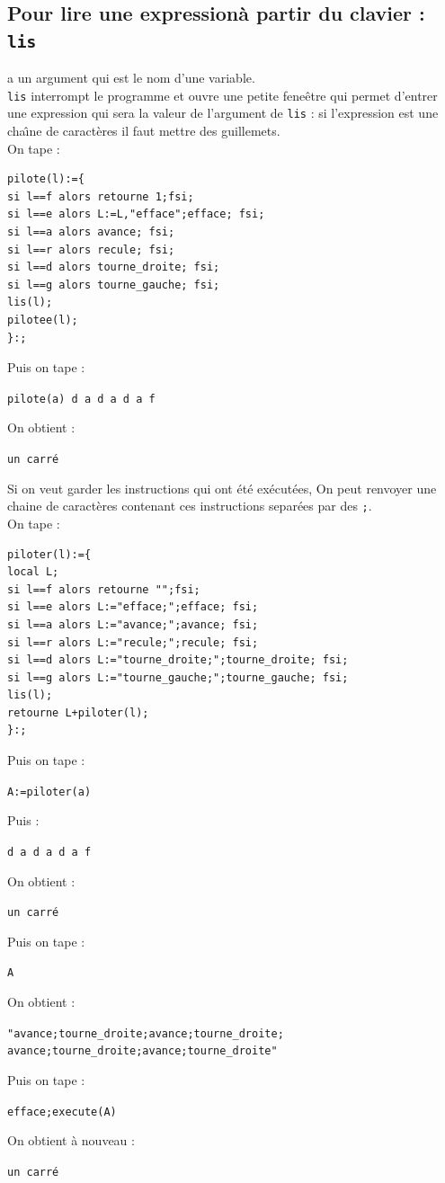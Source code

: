 \documentclass[a4paper,11pt]{book}
\begin{document}
\subsection{Pour lire une expression\`a partir du clavier : {\tt lis}}
 a un argument qui est le nom d'une variable.\\
{\tt lis} interrompt le programme et ouvre une petite fene\^etre qui permet 
d'entrer une expression qui sera la valeur de l'argument de {\tt lis} : si 
l'expression est une cha\^{\i}ne de caract\`eres il faut mettre des 
guillemets.\\
On tape :
\begin{verbatim}
pilote(l):={
si l==f alors retourne 1;fsi; 
si l==e alors L:=L,"efface";efface; fsi;
si l==a alors avance; fsi;
si l==r alors recule; fsi;
si l==d alors tourne_droite; fsi;
si l==g alors tourne_gauche; fsi;
lis(l);
pilotee(l);
}:;
\end{verbatim}
Puis on tape :
\begin{center}{\tt pilote(a) d a d a d a f}\end{center}
On obtient :
\begin{center}{\tt un carr\'e}\end{center}
Si on veut garder les instructions qui ont \'et\'e ex\'ecut\'ees, On peut  
renvoyer une chaine de caract\`eres contenant ces instructions separ\'ees par 
des {\tt ;}.\\
On tape :
\begin{verbatim}
piloter(l):={
local L;
si l==f alors retourne "";fsi; 
si l==e alors L:="efface;";efface; fsi;
si l==a alors L:="avance;";avance; fsi;
si l==r alors L:="recule;";recule; fsi;
si l==d alors L:="tourne_droite;";tourne_droite; fsi;
si l==g alors L:="tourne_gauche;";tourne_gauche; fsi;
lis(l);
retourne L+piloter(l);
}:;
\end{verbatim}
Puis on tape :
\begin{center}{\tt A:=piloter(a)}\end{center}
Puis :
\begin{center}{\tt d a d a d a f}\end{center}
On obtient :
\begin{center}{\tt un carr\'e}\end{center}
Puis on tape :
\begin{center}{\tt A}\end{center}
On obtient :
\begin{center}{\tt "avance;tourne\_droite;avance;tourne\_droite;\\
  avance;tourne\_droite;avance;tourne\_droite"}\end{center}
Puis on tape :
\begin{center}{\tt efface;execute(A)}\end{center}
On obtient \`a nouveau :
\begin{center}{\tt un carr\'e}\end{center}
\end{document}
